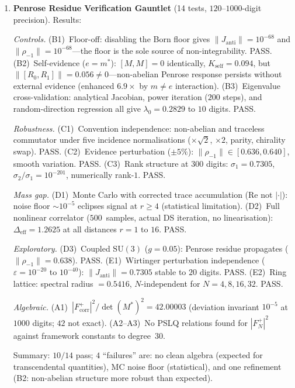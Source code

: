\documentclass[11pt,a4paper]{article}
\theoremstyle{definition}
\theoremstyle{remark}
\newcommand{\SU}{\mathrm{SU}}
\begin{document}
\begin{enumerate}[nosep]
\item \textbf{Penrose Residue Verification Gauntlet} (14 tests, $120$--$1000$-digit precision). Results:

\emph{Controls.} (B1)~Floor-off: disabling the Born floor gives $\|J_{\mathrm{anti}}\|=10^{-68}$ and $\|\rho_{-1}\|=10^{-68}$---the floor is the sole source of non-integrability. PASS. (B2)~Self-evidence ($e=m^*$): $[M,M]=0$ identically, $K_{\mathrm{self}}=0.094$, but $\|[R_0,R_1]\|=0.056\neq 0$---non-abelian Penrose response persists without external evidence (enhanced $6.9\times$ by $m\neq e$ interaction). (B3)~Eigenvalue cross-validation: analytical Jacobian, power iteration ($200$ steps), and random-direction regression all give $\lambda_0=0.2829$ to $10$ digits. PASS.

\emph{Robustness.} (C1)~Convention independence: non-abelian and traceless commutator under five incidence normalisations ($\times\sqrt{2}$, $\times 2$, parity, chirality swap). PASS. (C2)~Evidence perturbation ($\pm 5\%$): $\|\rho_{-1}\|\in[0.636,0.640]$, smooth variation. PASS. (C3)~Rank structure at $300$ digits: $\sigma_1=0.7305$, $\sigma_2/\sigma_1=10^{-201}$, numerically rank-$1$. PASS.

\emph{Mass gap.} (D1)~Monte Carlo with corrected trace accumulation ($\mathrm{Re}$ not $|\cdot|$): noise floor $\sim 10^{-5}$ eclipses signal at $r\geq 4$ (statistical limitation). (D2)~Full nonlinear correlator ($500$~samples, actual DS iteration, no linearisation): $\Delta_{\mathrm{eff}}=1.2625$ at all distances $r=1$ to $16$. PASS.

\emph{Exploratory.} (D3)~Coupled $\SU(3)$ ($g=0.05$): Penrose residue propagates ($\|\rho_{-1}\|=0.638$). PASS. (E1)~Wirtinger perturbation independence ($\varepsilon=10^{-20}$ to $10^{-40}$): $\|J_{\mathrm{anti}}\|=0.7305$ stable to $20$ digits. PASS. (E2)~Ring lattice: spectral radius $=0.5416$, $N$-independent for $N=4,8,16,32$. PASS.

\emph{Algebraic.} (A1)~$|F^+_{\mathrm{corr}}|^2/\det(M^*)^2=42.00003$ (deviation invariant $10^{-5}$ at $1000$ digits; $42$ not exact). (A2--A3)~No PSLQ relations found for $|F^+_N|^2$ against framework constants to degree~$30$.

Summary: $10/14$ pass; $4$ ``failures'' are: no clean algebra (expected for transcendental quantities), MC noise floor (statistical), and one refinement (B2: non-abelian structure more robust than expected).

\end{enumerate}
\end{document}
